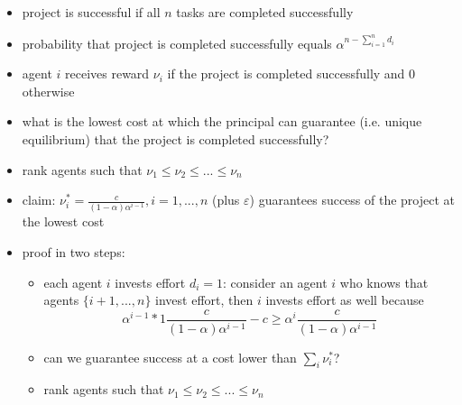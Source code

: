 \documentclass[11pt,english]{beamer}
\newcommand{\ve}{\varepsilon}
\begin{document}
\begin{frame}[allowframebreaks]
\begin{itemize}
\label{sec-4-1-12}%
\item project is successful if all $n$ tasks are completed successfully\\
\label{sec-4-1-13}%
\item probability that project is completed successfully equals $\alpha^{n-\sum_{i=1}^{n}d_{i}}$\\
\label{sec-4-1-14}%
\item agent $i$ receives reward $\nu_{i}$ if the project is completed successfully and 0 otherwise\\
\label{sec-4-1-15}%
\item what is the lowest cost at which the principal can guarantee (i.e. unique equilibrium) that the project is completed successfully?\\
\label{sec-4-1-16}%
\item rank agents such that $\nu_{1} \leq \nu_{2} \leq ... \leq \nu_{n}$\\
\label{sec-4-1-17}%
\item claim: $\nu^{*}_{i}=\frac{c}{(1-\alpha)\alpha^{i-1}}, i=1,...,n$ (plus $\ve$) guarantees success of the project at the lowest cost\\
\label{sec-4-1-18}%
\item proof in two steps:
\label{sec-4-1-19}%
\begin{itemize}

\item each agent $i$ invests effort $d_{i}=1$: consider an agent $i$ who knows that agents $\{i+1,...,n\}$ invest effort, then $i$ invests effort as well because
\label{sec-4-1-19-1}%
\begin{equation*}
\alpha^{i-1}*1 \frac{c}{(1-\alpha)\alpha^{i-1}}-c \geq \alpha^i \frac{c}{(1-\alpha)\alpha^{i-1}}
\end{equation*}

\item can we guarantee success at a cost lower than
  $\sum_{i}\nu^*_{i}$?

\item rank agents such that $\nu_{1} \leq \nu_{2} \leq ... \leq \nu_{n}$
\begin{itemize}


\end{itemize}
\end{itemize}
\end{itemize}
\end{frame}
\end{document}
